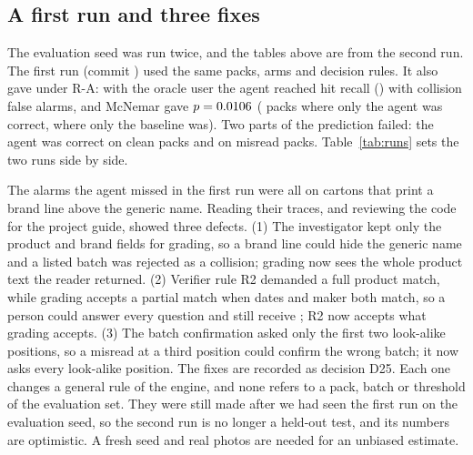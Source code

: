 \subsection{A first run and three fixes}
\label{sec:runs}
The evaluation seed was run twice, and the tables above are from the second run. The first run (commit \texttt{\RunOneCommit}) used the same packs, arms and decision rules. It also gave \textbf{\RunOneRulesOracleDecision} under R-A: with the oracle user the agent reached hit recall \RunOneRulesOracleHitRecall{} (\RunOneRulesOracleHitRecallK) with \RunOneRulesOracleFARCollisionK{} collision false alarms, and McNemar gave $p = 0.0106$ (\RunOneRulesOracleMcNemarB{} packs where only the agent was correct, \RunOneRulesOracleMcNemarC{} where only the baseline was). Two parts of the prediction failed: the agent was correct on \RunOneRulesOracleCleanK{} clean packs and on \RunOneRulesOracleMisreadK{} misread packs. Table~\ref{tab:runs} sets the two runs side by side.

The \RunOneRulesOracleMisses{} alarms the agent missed in the first run were all on cartons that print a brand line above the generic name. Reading their traces, and reviewing the code for the project guide, showed three defects. (1) The investigator kept only the product and brand fields for grading, so a brand line could hide the generic name and a listed batch was rejected as a collision; grading now sees the whole product text the reader returned. (2) Verifier rule R2 demanded a full product match, while grading accepts a partial match when dates and maker both match, so a person could answer every question and still receive \CANTV; R2 now accepts what grading accepts. (3) The batch confirmation asked only the first two look-alike positions, so a misread at a third position could confirm the wrong batch; it now asks every look-alike position. The fixes are recorded as decision D25. Each one changes a general rule of the engine, and none refers to a pack, batch or threshold of the evaluation set. They were still made after we had seen the first run on the evaluation seed, so the second run is no longer a held-out test, and its numbers are optimistic. A fresh seed and real photos are needed for an unbiased estimate.

